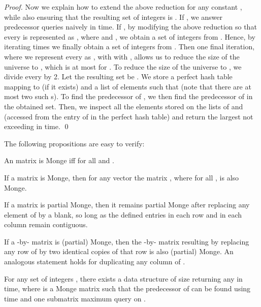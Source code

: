 \documentclass{llncs}
\begin{document}
\begin{proof}
Now we explain how to extend the above reduction for any constant , while also
ensuring that the resulting set of integers is .
If , we answer predecessor queries naively in  time.
If , by modifying the above reduction so that every  is represented as ,
where  and , we obtain a set of  integers from .
Hence, by iterating  times we finally obtain a set of  integers from .
Then one final iteration, where we represent every  as ,
with  with ,
allows us to reduce the size of the universe to , which is at most 
for .
To reduce the size of the universe to , we divide every  by 2.
Let the resulting set be . 
We store a perfect hash table mapping  to  (if it exists) and a list of elements  such that
 (note that there are at most two such s).
To find the predecessor of , we then find the predecessor  of  in the obtained set.
Then, we inspect all the elements stored on the lists of  and  (accessed from the entry of  in the
perfect hash table) and return the largest not exceeding  in  time.
\qed \end{proof}

\noindent The following propositions are easy to verify:

\begin{proposition}
\label{prop:adjacent condition}
An  matrix  is Monge iff  for all  and .
\end{proposition}

\begin{proposition}
\label{prop:adjustment}
If a matrix  is Monge, then for any vector  the matrix , where  for all , is also Monge.
\end{proposition}

\begin{proposition}
\label{prop:undef}
If a matrix  is partial Monge, then it remains partial Monge after replacing any element of  by a blank, so long as the defined entries in each row and in each column remain contiguous.
\end{proposition}

\begin{proposition}
\label{prop:duplicate}
If a -by- matrix  is (partial) Monge, then the -by- matrix resulting by replacing any row of  by two identical copies of that row is also (partial) Monge. An analogous statement holds for duplicating any column of . 
\end{proposition}

\begin{theorem}
\label{thm:reduction}
For any set of  integers , there exists a data structure of size  returning any 
in  time, where  is a Monge matrix such that the predecessor of  can be found using  time and one
submatrix maximum query on .

\end{theorem}
\end{document}
